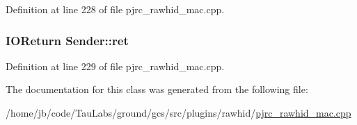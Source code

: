 \-Definition at line 228 of file pjrc\-\_\-rawhid\-\_\-mac.\-cpp.

\hypertarget{class_sender_aff1c122c343fa8ae82aa5b36ae2a17a7}{
\subsubsection[{ret}]{\setlength{\rightskip}{0pt plus 5cm}\-I\-O\-Return {\bf \-Sender\-::ret}}}\label{class_sender_aff1c122c343fa8ae82aa5b36ae2a17a7}


\-Definition at line 229 of file pjrc\-\_\-rawhid\-\_\-mac.\-cpp.



\-The documentation for this class was generated from the following file\-:\begin{DoxyCompactItemize}
\item 
/home/jb/code/\-Tau\-Labs/ground/gcs/src/plugins/rawhid/\hyperlink{pjrc__rawhid__mac_8cpp}{pjrc\-\_\-rawhid\-\_\-mac.\-cpp}\end{DoxyCompactItemize}
